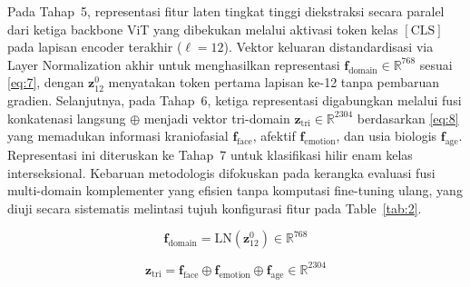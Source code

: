 Pada Tahap~5, representasi fitur laten tingkat tinggi diekstraksi secara paralel dari ketiga backbone ViT yang dibekukan melalui aktivasi token kelas $[\text{CLS}]$ pada lapisan encoder terakhir ($\ell = 12$). Vektor keluaran distandardisasi via Layer Normalization akhir untuk menghasilkan representasi $\mathbf{f}_{\text{domain}} \in \mathbb{R}^{768}$ sesuai \eqref{eq:7}, dengan $\mathbf{z}_{12}^0$ menyatakan token pertama lapisan ke-12 tanpa pembaruan gradien. Selanjutnya, pada Tahap~6, ketiga representasi digabungkan melalui fusi konkatenasi langsung $\oplus$ menjadi vektor tri-domain $\mathbf{z}_{\text{tri}} \in \mathbb{R}^{2304}$ berdasarkan \eqref{eq:8} yang memadukan informasi kraniofasial $\mathbf{f}_{\text{face}}$, afektif $\mathbf{f}_{\text{emotion}}$, dan usia biologis $\mathbf{f}_{\text{age}}$. Representasi ini diteruskan ke Tahap~7 untuk klasifikasi hilir enam kelas interseksional. Kebaruan metodologis difokuskan pada kerangka evaluasi fusi multi-domain komplementer yang efisien tanpa komputasi fine-tuning ulang, yang diuji secara sistematis melintasi tujuh konfigurasi fitur pada Table~\ref{tab:2}.

\begin{equation}
\mathbf{f}_{\text{domain}} = \text{LN}(\mathbf{z}_{12}^0) \in \mathbb{R}^{768}
\label{eq:7}
\end{equation}

\begin{equation}
\mathbf{z}_{\text{tri}} = \mathbf{f}_{\text{face}} \oplus \mathbf{f}_{\text{emotion}} \oplus \mathbf{f}_{\text{age}} \in \mathbb{R}^{2304}
\label{eq:8}
\end{equation}
